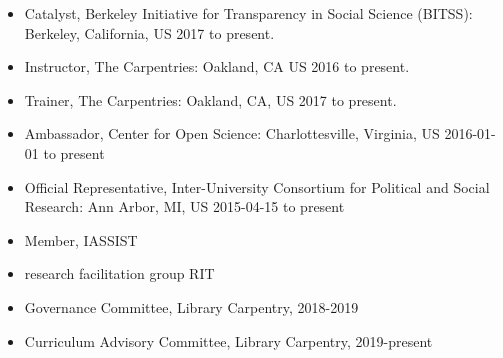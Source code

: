 \begin{itemize}
\item Catalyst, Berkeley Initiative for Transparency in Social Science (BITSS): Berkeley, California, US 2017 to present. 
\item Instructor, The Carpentries: Oakland, CA US 2016 to present.
\item Trainer, The Carpentries: Oakland, CA, US  2017 to present.
\item Ambassador, Center for Open Science: Charlottesville, Virginia, US 2016-01-01 to present
\item Official Representative, Inter-University Consortium for Political and Social Research: Ann Arbor, MI, US 2015-04-15 to present 
\item Member, IASSIST 
\item research facilitation group RIT
\item Governance Committee, Library Carpentry, 2018-2019
\item Curriculum Advisory Committee, Library Carpentry, 2019-present
\end{itemize}